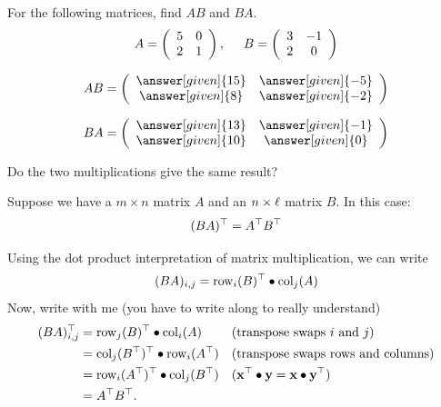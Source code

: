 \documentclass{ximera}
\begin{document}
\begin{question}
For the following matrices, find $AB$ and $BA$.
\[
A= \left(\begin{array}{cc}
5 & 0 \\
2 & 1
\end{array}\right), \hspace{.5cm} B = \left(\begin{array}{cc}
3 & -1 \\
2 & 0
\end{array}\right)
\]
\begin{prompt}
\[
AB = \left(\begin{array}{cc}
\answer[given]{15} & \answer[given]{-5}\\
\answer[given]{8} & \answer[given]{-2}
\end{array}\right)\]

\[BA = \left(\begin{array}{cc}
\answer[given]{13} & \answer[given]{-1}\\
\answer[given]{10} & \answer[given]{0}
\end{array}\right)\]
\end{prompt}
Do the two multiplications give the same result? 
\end{question}







\begin{proposition}
  Suppose we have a $m\times n$ matrix $A$ and an $n\times \ell$ matrix $B$. In this case:
  \[
  (BA)^\top = A^\top B^\top
  \]
  \begin{explanation}
    Using the dot product interpretation of matrix multiplication, we can write
    \[
      (BA)_{i,j} = \operatorname{row}_i(B)^\top \bullet \operatorname{col}_j(A)
    \]
    Now, write with me (you have to write along to really understand)
    \begin{align*}
      (BA)_{i,j}^\top &= \operatorname{row}_j(B)^\top \bullet \operatorname{col}_i(A) & & (\text{transpose swaps $i$ and $j$})\\
      &= \operatorname{col}_j(B^\top)^\top \bullet \operatorname{row}_i(A^\top) & & (\text{transpose swaps rows and columns})\\
      &= \operatorname{row}_i(A^\top)^\top \bullet \operatorname{col}_j(B^\top) & & (\mathbf{x}^\top \bullet \mathbf{y} = \mathbf{x}\bullet \mathbf{y}^\top)\\
      &= A^\top B^\top.
    \end{align*}
  \end{explanation}
\end{proposition}
\end{document}
